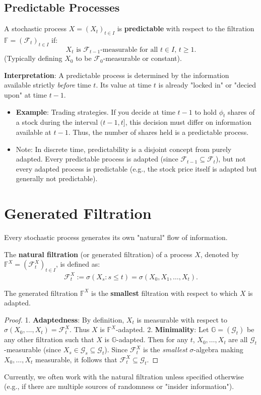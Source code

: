 \subsection{Predictable Processes}
\begin{definition}
A stochastic process $X = (X_t)_{t \in I}$ is \textbf{predictable} with respect to the filtration $\mathbb{F} = (\mathcal{F}_t)_{t \in I}$ if:
\[
X_{t} \text{ is } \mathcal{F}_{t-1}\text{-measurable for all } t \in I, \, t \ge 1.
\]
(Typically defining $X_0$ to be $\mathcal{F}_0$-measurable or constant).
\end{definition}

\textbf{Interpretation}: A predictable process is determined by the information available strictly \textit{before} time $t$. Its value at time $t$ is already "locked in" or "decied upon" at time $t-1$.
\begin{itemize}
    \item \textbf{Example}: Trading strategies. If you decide at time $t-1$ to hold $\phi_t$ shares of a stock during the interval $(t-1, t]$, this decision must differ on information available at $t-1$. Thus, the number of shares held is a predictable process.
    \item Note: In discrete time, predictability is a disjoint concept from purely adapted. Every predictable process is adapted (since $\mathcal{F}_{t-1} \subseteq \mathcal{F}_t$), but not every adapted process is predictable (e.g., the stock price itself is adapted but generally not predictable).
\end{itemize}

\section{Generated Filtration}

Every stochastic process generates its own "natural" flow of information.

\begin{definition}
The \textbf{natural filtration} (or generated filtration) of a process $X$, denoted by $\mathbb{F}^X = (\mathcal{F}^X_t)_{t \in I}$, is defined as:
\[
\mathcal{F}^X_t := \sigma(X_s : s \le t) = \sigma(X_0, X_1, \dots, X_t).
\]
\end{definition}

\begin{proposition}
The generated filtration $\mathbb{F}^X$ is the \textbf{smallest} filtration with respect to which $X$ is adapted.
\end{proposition}
\begin{proof}
1. \textbf{Adaptedness}: By definition, $X_t$ is measurable with respect to $\sigma(X_0, \dots, X_t) = \mathcal{F}^X_t$. Thus $X$ is $\mathbb{F}^X$-adapted.
2. \textbf{Minimality}: Let $\mathbb{G} = (\mathcal{G}_t)$ be any other filtration such that $X$ is $\mathbb{G}$-adapted. Then for any $t$, $X_0, \dots, X_t$ are all $\mathcal{G}_t$-measurable (since $X_s \in \mathcal{G}_s \subseteq \mathcal{G}_t$). Since $\mathcal{F}^X_t$ is the \textit{smallest} $\sigma$-algebra making $X_0, \dots, X_t$ measurable, it follows that $\mathcal{F}^X_t \subseteq \mathcal{G}_t$.
\end{proof}

Currently, we often work with the natural filtration unless specified otherwise (e.g., if there are multiple sources of randomness or "insider information").
